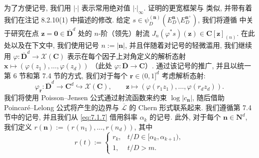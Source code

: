 为了方便记号, 我们用 \(|\cdot|\) 表示常用绝对值 \(|\cdot|_{\infty}\). 
证明的更宽框架与 \cite[第 4.3.3 节]{Bos01} 类似, 
并带有着我们在注记 8.2.10(1) 中描述的修改. 
给定 \(s \in \psi_D^{(\mathbf{n})}(E_D^{\mathbf{n}} \setminus E_D^{\mathbf{n}^+})\), 
我们将遵循 \cite[第 2.4 节]{CDT21} 中关于研究在点 \(\mathbf{z} = \mathbf{0} \in \overline{\mathbf{D}}^d\) 
处的 \(n\)-阶（领先）射流 \(J_n(\varphi^*s)(\mathbf{z}) \in \mathbf{C}[\mathbf{z}]_{(n)}\). 
在此处以及在下文中, 我们使用记号 \(n := |\mathbf{n}|\), 
并且伴随着对记号的轻微滥用, 我们继续用 \(\varphi : \overline{\mathbf{D}}^d \to \mathcal{X}(\mathbf{C})\) 
表示在每个因子上对角定义的解析态射 \(\mathbf{x} \mapsto (\varphi(z_1), \dots, \varphi(z_d))\) （此处 \(\varphi : \overline{\mathbf{D}} \to \mathbf{C}\)）. 
通过该记号的推广, 并且以统一第 6 节和第 7.4 节的方式, 
我们对于每个 \(\mathbf{r} \in (0, 1]^d\) 考虑解析态射:
\[ \varphi_{\mathbf{r}}: \overline{\mathbf{D}}^d \to \mathbf{C}^d \hookrightarrow \mathcal{X}(\mathbf{C}), \qquad \mathbf{z} \mapsto (\varphi(r_1 z_1), \dots, \varphi(r_d z_d)). \]
我们将使用 Poisson--Jensen 公式通过射流函数来约束 \(\log |c_{\mathbf{n}}|\), 
随后借助 Poincaré--Lelong 公式将产生的边界与 \(\overline{\mathcal{L}}\) 的 Chern 形式联系起来. 
我们遵循第 7.4 节中的记号, 并且我们从 \eqref{eq:7.1.7} 借用斜率 \(\alpha_k\) 的记号. 
此外, 对于每个 \(\mathbf{n} \in \mathbf{N}^d\), 我们定义 \(r(\mathbf{n}) := (r(n_1), \ldots, r(n_d))\), 
其中
\begin{equation}\label{eq:8.2.12}
r(t) := \begin{cases} r_k, & t/D \in [\alpha_k, \alpha_{k+1}), \\ 1, & t/D > m. \end{cases}
\end{equation}

